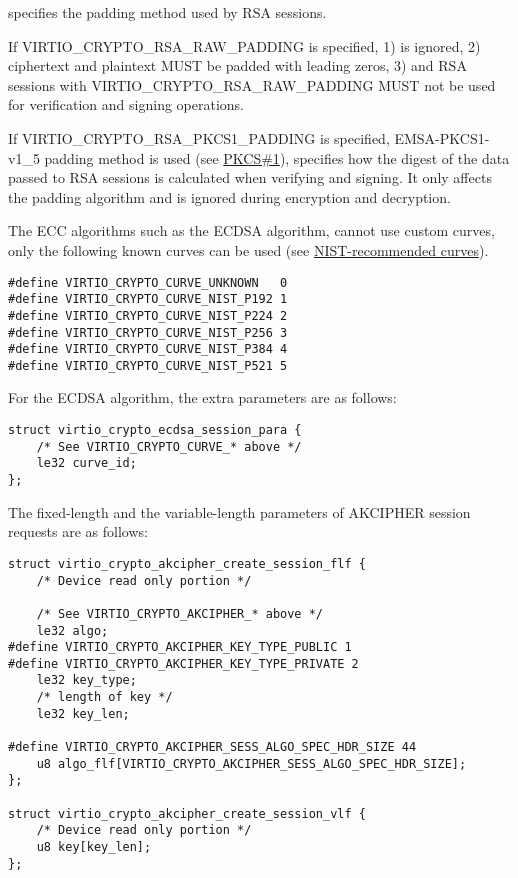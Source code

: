  specifies the padding method used by RSA sessions.
\begin{itemize*}
\item If VIRTIO_CRYPTO_RSA_RAW_PADDING is specified, 1) 
is ignored, 2) ciphertext and plaintext MUST be padded with leading zeros,
3) and RSA sessions with VIRTIO_CRYPTO_RSA_RAW_PADDING MUST not be used
for verification and signing operations.
\item If VIRTIO_CRYPTO_RSA_PKCS1_PADDING is specified, EMSA-PKCS1-v1_5 padding method
is used (see \hyperref[intro:rfc3447]{PKCS\#1}),  specifies how the
digest of the data passed to RSA sessions is calculated when verifying and signing.
It only affects the padding algorithm and is ignored during encryption and decryption.
\end{itemize*}

The ECC algorithms such as the ECDSA algorithm, cannot use custom curves, only the
following known curves can be used (see \hyperref[intro:NIST]{NIST-recommended curves}).

\begin{lstlisting}
#define VIRTIO_CRYPTO_CURVE_UNKNOWN   0
#define VIRTIO_CRYPTO_CURVE_NIST_P192 1
#define VIRTIO_CRYPTO_CURVE_NIST_P224 2
#define VIRTIO_CRYPTO_CURVE_NIST_P256 3
#define VIRTIO_CRYPTO_CURVE_NIST_P384 4
#define VIRTIO_CRYPTO_CURVE_NIST_P521 5
\end{lstlisting}

For the ECDSA algorithm, the extra parameters are as follows:
\begin{lstlisting}
struct virtio_crypto_ecdsa_session_para {
    /* See VIRTIO_CRYPTO_CURVE_* above */
    le32 curve_id;
};
\end{lstlisting}

The fixed-length and the variable-length parameters of AKCIPHER session requests are as follows:
\begin{lstlisting}
struct virtio_crypto_akcipher_create_session_flf {
    /* Device read only portion */

    /* See VIRTIO_CRYPTO_AKCIPHER_* above */
    le32 algo;
#define VIRTIO_CRYPTO_AKCIPHER_KEY_TYPE_PUBLIC 1
#define VIRTIO_CRYPTO_AKCIPHER_KEY_TYPE_PRIVATE 2
    le32 key_type;
    /* length of key */
    le32 key_len;

#define VIRTIO_CRYPTO_AKCIPHER_SESS_ALGO_SPEC_HDR_SIZE 44
    u8 algo_flf[VIRTIO_CRYPTO_AKCIPHER_SESS_ALGO_SPEC_HDR_SIZE];
};

struct virtio_crypto_akcipher_create_session_vlf {
    /* Device read only portion */
    u8 key[key_len];
};
\end{lstlisting}


